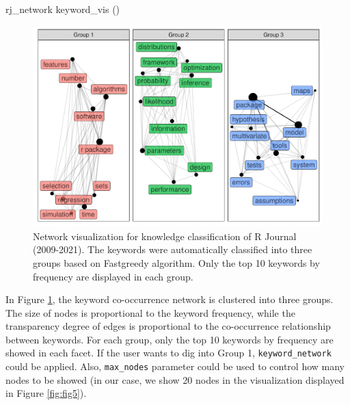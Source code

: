 \begin{Schunk}
\begin{Sinput}
rj_network %
  keyword_vis ()
\end{Sinput}
\begin{figure}

{\centering \includegraphics[width=1\linewidth]{akc_files/figure-latex/fig4-1} 

}

\caption[Network visualization for knowledge classification of R Journal (2009-2021)]{Network visualization for knowledge classification of R Journal (2009-2021). The keywords were automatically classified into three groups based on Fastgreedy algorithm. Only the top 10 keywords by frequency are displayed in each group.}\label{fig:fig4}
\end{figure}
\end{Schunk}

In Figure \ref{fig:fig4}, the keyword co-occurrence network is clustered
into three groups. The size of nodes is proportional to the keyword
frequency, while the transparency degree of edges is proportional to the
co-occurrence relationship between keywords. For each group, only the
top 10 keywords by frequency are showed in each facet. If the user wants
to dig into Group 1, \texttt{keyword\_network} could be applied. Also,
\texttt{max\_nodes} parameter could be used to control how many nodes to
be showed (in our case, we show 20 nodes in the visualization displayed
in Figure \ref{fig:fig5}).

